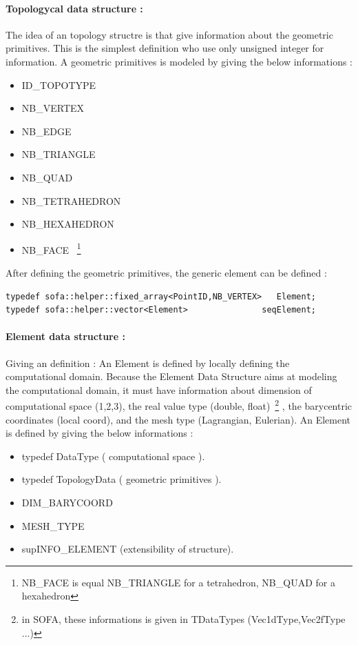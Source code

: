 \documentclass[a4paper,10pt]{article}
\begin{document}
\paragraph{Topologycal data structure : }
The idea of an topology structre is that give information about the geometric primitives. This is the simplest definition who use only unsigned integer for information. A geometric primitives is modeled by giving the below informations : 
\begin{itemize}
 \item ID\_TOPOTYPE
 \item NB\_VERTEX
 \item NB\_EDGE
 \item NB\_TRIANGLE
 \item NB\_QUAD
 \item NB\_TETRAHEDRON 
 \item NB\_HEXAHEDRON
 \item NB\_FACE ~\footnote{ NB\_FACE is equal NB\_TRIANGLE for a tetrahedron, NB\_QUAD for a hexahedron}
\end{itemize}
After defining the geometric primitives, the generic element can be defined : 
\begin{lstlisting}
typedef sofa::helper::fixed_array<PointID,NB_VERTEX>   Element;
typedef sofa::helper::vector<Element>               seqElement;
\end{lstlisting} 
\paragraph{Element data structure : }
Giving an definition : An Element is defined by locally defining the computational domain. Because the Element Data Structure aims at modeling the computational domain, it must have information about dimension of computational space (1,2,3), the real value type (double, float)~\footnote{ in SOFA, these informations is given in TDataTypes (Vec1dType,Vec2fType ...)} , the barycentric coordinates (local coord), and the mesh type (Lagrangian, Eulerian). An Element is defined by giving the below informations : 
\begin{itemize}
 \item typedef DataType ( computational space ).
 \item typedef TopologyData ( geometric primitives ).
 \item DIM\_BARYCOORD
 \item MESH\_TYPE
 \item supINFO\_ELEMENT (extensibility of structure).
\end{itemize}
\end{document}
